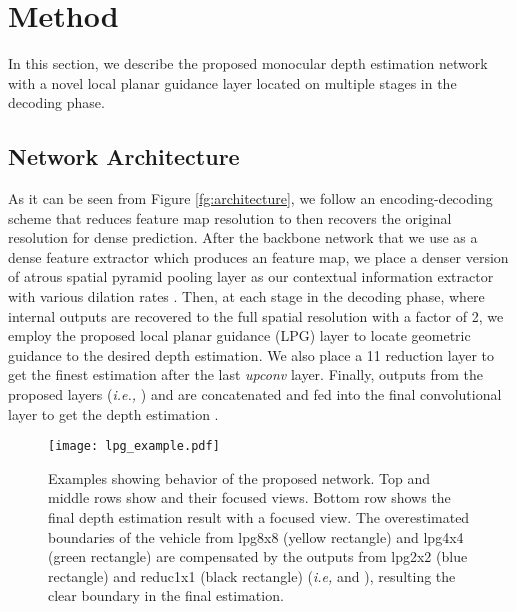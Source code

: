 \documentclass[10pt,twocolumn,letterpaper]{article}
\begin{document}
\section{Method}
\label{sec:method}
In this section, we describe the proposed monocular depth estimation network with a novel local planar guidance layer located on multiple stages in the decoding phase.

\subsection{Network Architecture}
As it can be seen from Figure \ref{fg:architecture}, we follow an encoding-decoding scheme that reduces feature map resolution to  then recovers the original resolution  for dense prediction. 
After the backbone network that we use as a dense feature extractor which produces an  feature map, we place a denser version \cite{yang2018denseaspp} of atrous spatial pyramid pooling layer \cite{chen2018deeplab} as our contextual information extractor with various dilation rates .
Then, at each stage in the decoding phase, where internal outputs are recovered to the full spatial resolution with a factor of 2, we employ the proposed local planar guidance (LPG) layer to locate geometric guidance to the desired depth estimation.
We also place a 11 reduction layer to get the finest estimation  after the last \textit{upconv} layer.
Finally, outputs from the proposed layers (\textit{i.e.,} ) and  are concatenated and fed into the final convolutional layer to get the depth estimation .

\begin{figure}[t!]
	\centering
	\footnotesize
	\texttt{[image: lpg\_example.pdf]}
	\caption{Examples showing behavior of the proposed network. Top and middle rows show  and their focused views. Bottom row shows the final depth estimation result with a focused view. The overestimated boundaries of the vehicle from lpg8x8 (yellow rectangle) and lpg4x4 (green rectangle) are compensated by the outputs from lpg2x2 (blue rectangle) and reduc1x1 (black rectangle) (\textit{i.e,}  and ), resulting the clear boundary in the final estimation.}
	\label{fg:lpg_examples}
	\vspace{-0.4cm}
\end{figure}
\end{document}
